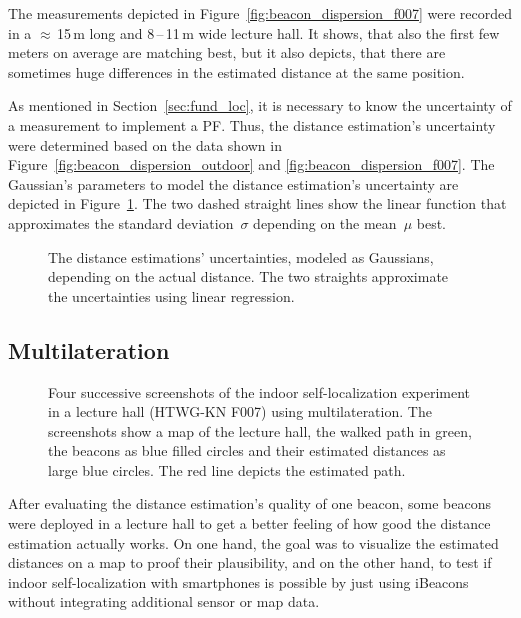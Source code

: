 The measurements depicted in Figure~\ref{fig:beacon_dispersion_f007} were recorded in a $\approx$\,15\,m long and 8\,--\,11\,m wide lecture hall. It shows, that also the first few meters on average are matching best, but it also depicts, that there are sometimes huge differences in the estimated distance at the same position.

As mentioned in Section~\ref{sec:fund_loc}, it is necessary to know the uncertainty of a measurement to implement a \acl{PF}. Thus, the distance estimation's uncertainty were determined based on the data shown in Figure~\ref{fig:beacon_dispersion_outdoor} and \ref{fig:beacon_dispersion_f007}. The Gaussian's parameters to model the distance estimation's uncertainty are depicted in Figure~\ref{fig:beacon_eval_ndf}. The two dashed straight lines show the linear function that approximates the standard deviation~$\sigma$ depending on the mean~$\mu$ best.

\begin{figure}
	
	\caption{The distance estimations' uncertainties, modeled as Gaussians, depending on the actual distance. The two straights approximate the uncertainties using linear regression.}
	\label{fig:beacon_eval_ndf}
\end{figure}


\subsection{Multilateration}

\begin{figure}
  
  \caption{Four successive screenshots of the indoor self-localization experiment in a lecture hall (HTWG-KN F007) using multilateration. The screenshots show a map of the lecture hall, the walked path in green, the beacons as blue filled circles and their estimated distances as large blue circles. The red line depicts the estimated path.}
  \label{fig:beacon_eval_multilat}
\end{figure}

After evaluating the distance estimation's quality of one beacon, some beacons were deployed in a lecture hall to get a better feeling of how good the distance estimation actually works. On one hand, the goal was to visualize the estimated distances on a map to proof their plausibility, and on the other hand, to test if indoor self-localization with smartphones is possible by just using iBeacons without integrating additional sensor or map data.

